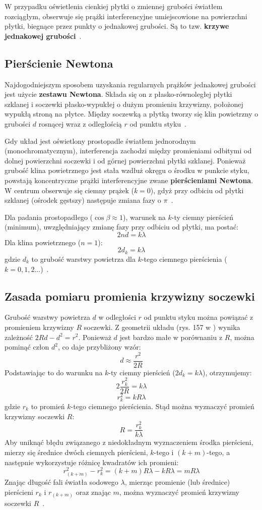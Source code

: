 \documentclass[a4paper,12pt]{article}
\begin{document}
W przypadku oświetlenia cienkiej płytki o zmiennej grubości światłem rozciągłym, obserwuje się prążki interferencyjne umiejscowione na powierzchni płytki, biegnące przez punkty o jednakowej grubości. Są to tzw. \textbf{krzywe jednakowej grubości}~\citep{Drynski1976}.

\subsection*{Pierścienie Newtona}

Najdogodniejszym sposobem uzyskania regularnych prążków jednakowej grubości jest użycie \textbf{zestawu Newtona}. Składa się on z płasko-równoległej płytki szklanej i soczewki płasko-wypukłej o dużym promieniu krzywizny, położonej wypukłą stroną na płytce. Między soczewką a płytką tworzy się klin powietrzny o grubości \(d\) rosnącej wraz z odległością \(r\) od punktu styku~\citep{Drynski1976}.

Gdy układ jest oświetlony prostopadle światłem jednorodnym (monochromatycznym), interferencja zachodzi między promieniami odbitymi od dolnej powierzchni soczewki i od górnej powierzchni płytki szklanej. Ponieważ grubość klina powietrznego jest stała wzdłuż okręgu o środku w punkcie styku, powstają koncentryczne prążki interferencyjne zwane \textbf{pierścieniami Newtona}. W centrum obserwuje się ciemny prążek (\(k=0\)), gdyż przy odbiciu od płytki szklanej (ośrodek gęstszy) następuje zmiana fazy o \(\pi\)~\citep{Drynski1976}.

Dla padania prostopadłego (\(\cos\beta \approx 1\)), warunek na \(k\)-ty ciemny pierścień (minimum), uwzględniający zmianę fazy przy odbiciu od płytki, ma postać:
$$
    2nd = k\lambda
$$
Dla klina powietrznego (\(n=1\)):
$$
    2d_k = k\lambda
$$
gdzie \(d_k\) to grubość warstwy powietrza dla \(k\)-tego ciemnego pierścienia (\(k=0, 1, 2...\))~\citep{Drynski1976}.

\subsection*{Zasada pomiaru promienia krzywizny soczewki}
Grubość warstwy powietrza \(d\) w odległości \(r\) od punktu styku można powiązać z promieniem krzywizny \(R\) soczewki. Z geometrii układu (rys. 157 w \citep{Drynski1976}) wynika zależność \(2Rd - d^2 = r^2\). Ponieważ \(d\) jest bardzo małe w porównaniu z \(R\), można pominąć człon \(d^2\), co daje przybliżony wzór:
$$
    d \approx \frac{r^2}{2R}
$$
Podstawiając to do warunku na \(k\)-ty ciemny pierścień (\(2d_k = k\lambda\)), otrzymujemy:
$$
    2 \frac{r_k^2}{2R} = k\lambda
$$
$$
    r_k^2 = k R \lambda
$$
gdzie \(r_k\) to promień \(k\)-tego ciemnego pierścienia. Stąd można wyznaczyć promień krzywizny soczewki \(R\):
$$
    R = \frac{r_k^2}{k\lambda}
$$
Aby uniknąć błędu związanego z niedokładnym wyznaczeniem środka pierścieni, mierzy się średnice dwóch ciemnych pierścieni, \(k\)-tego i \((k+m)\)-tego, a następnie wykorzystuje różnicę kwadratów ich promieni:
$$
    r_{(k+m)}^2 - r_k^2 = (k+m)R\lambda - kR\lambda = mR\lambda
$$
Znając długość fali światła sodowego \(\lambda\), mierząc promienie (lub średnice) pierścieni \(r_k\) i \(r_{(k+m)}\) oraz znając \(m\), można wyznaczyć promień krzywizny soczewki \(R\)~\citep{Drynski1976}.
\end{document}
